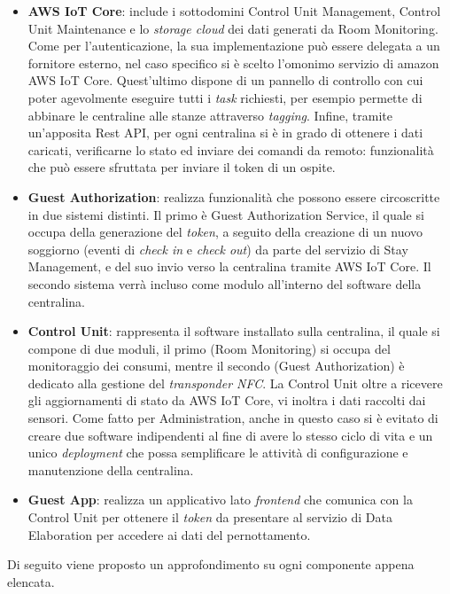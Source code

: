 \begin{itemize}
    \item \textbf{AWS IoT Core}: include i sottodomini Control Unit Management, Control Unit Maintenance e lo \textit{storage cloud} dei dati generati da Room Monitoring. Come per l'autenticazione, la sua implementazione può essere delegata a un fornitore esterno, nel caso specifico si è scelto l'omonimo servizio di amazon AWS IoT Core. Quest'ultimo dispone di un pannello di controllo con cui poter agevolmente eseguire tutti i \textit{task} richiesti, per esempio permette di abbinare le centraline alle stanze attraverso \textit{tagging}. Infine, tramite un'apposita Rest API, per ogni centralina si è in grado di ottenere i dati caricati, verificarne lo stato ed inviare dei comandi da remoto: funzionalità che può essere sfruttata per inviare il token di un ospite.
    \item \textbf{Guest Authorization}: realizza funzionalità che possono essere circoscritte in due sistemi distinti. Il primo è Guest Authorization Service, il quale si occupa della generazione del \textit{token}, a seguito della creazione di un nuovo soggiorno (eventi di \textit{check in} e \textit{check out}) da parte del servizio di Stay Management, e del suo invio verso la centralina tramite AWS IoT Core. Il secondo sistema verrà incluso come modulo all'interno del software della centralina.
    \item \textbf{Control Unit}: rappresenta il software installato sulla centralina, il quale si compone di due moduli, il primo (Room Monitoring) si occupa del monitoraggio dei consumi, mentre il secondo (Guest Authorization) è dedicato alla gestione del \textit{transponder NFC}. La Control Unit oltre a ricevere gli aggiornamenti di stato da AWS IoT Core, vi inoltra i dati raccolti dai sensori. Come fatto per Administration, anche in questo caso si è evitato di creare due software indipendenti al fine di avere lo stesso ciclo di vita e un unico \textit{deployment} che possa semplificare le attività di configurazione e manutenzione della centralina.
    \item \textbf{Guest App}: realizza un applicativo lato \textit{frontend} che comunica con la Control Unit per ottenere il \textit{token} da presentare al servizio di Data Elaboration per accedere ai dati del pernottamento.
\end{itemize}

Di seguito viene proposto un approfondimento su ogni componente appena elencata.

